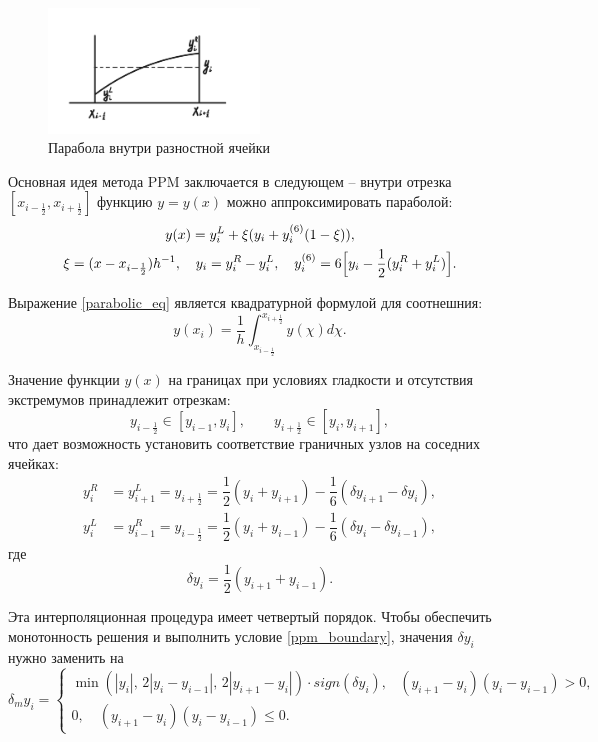 \documentclass[12pt,a4paper]{article}
\newcommand{\half}{\frac{1}{2}}
\newcommand{\dhalf}{\dfrac{1}{2}}
\begin{document}
    \begin{figure}[h]
        \centering
        \includegraphics[width=0.5\textwidth]{ppm_visual.jpeg}
        \caption{Парабола внутри разностной ячейки}
        \label{fig:ppm_visual}
    \end{figure}

    Основная идея метода PPM заключается в следующем -- внутри отрезка $ [x_{i-\half}, x_{i+\half}] $ функцию $ y = y(x) $ можно аппроксимировать параболой:
    \begin{multline}
        \label{parabolic_eq}
        y(x) = y_i^L + \xi(\Delta y_i + y_i^{(6)}(1 - \xi)), \\
        \xi = (x - x_{i-\half})h^{-1}, \quad \Delta y_i = y_i^R-y_i^L, \quad y_i^{(6)} = 6\Bigl[ y_i - \half(y_i^R + y_i^L)\Bigr].
    \end{multline}

    Выражение \eqref{parabolic_eq} является квадратурной формулой для соотнешния:
    \[
        y(x_i) = \dfrac{1}{h} \displaystyle \int_{x_{i-\half}}^{x_{i+\half}} y(\chi) d\chi.
    \]

   Значение функции $ y(x) $ на границах при условиях гладкости и отсутствия экстремумов принадлежит отрезкам:
   \begin{equation}
        \label{ppm_boundary}
        y_{i-\half} \in [y_{i-1}, y_i], \qquad y_{i+\half} \in [y_i, y_{i+1}], 
   \end{equation}
   \noindent что дает возможность установить соответствие граничных узлов на соседних ячейках:
   \[
        \begin{split}
            y_i^R &= y_{i+1}^L = y_{i+\half} = \dhalf(y_i + y_{i+1}) - \dfrac{1}{6}(\delta y_{i+1} - \delta y_i), \\[0.7em]
            y_i^L &= y_{i-1}^R = y_{i-\half} = \dhalf(y_i + y_{i-1}) - \dfrac{1}{6}(\delta y_{i} - \delta y_{i-1}), 
        \end{split}
   \] 
   \noindent где 
   \[
        \delta y_i = \dhalf(y_{i+1} + y_{i-1}).
   \]

    Эта интерполяционная процедура имеет четвертый порядок. Чтобы обеспечить монотонность решения и выполнить условие \eqref{ppm_boundary}, значения $ \delta y_i $ нужно заменить на 
    \[
        \delta_m y_i = 
        \begin{cases}
            \min(|y_i|,\, 2|y_i - y_{i-1}|,\, 2|y_{i+1} - y_i|)\cdot sign(\delta y_i), & (y_{i+1} - y_i)(y_i - y_{i-1}) > 0, \\
            0, \quad (y_{i+1} - y_i)(y_i - y_{i-1}) \leq 0.
        \end{cases}  
    \]
\end{document}
